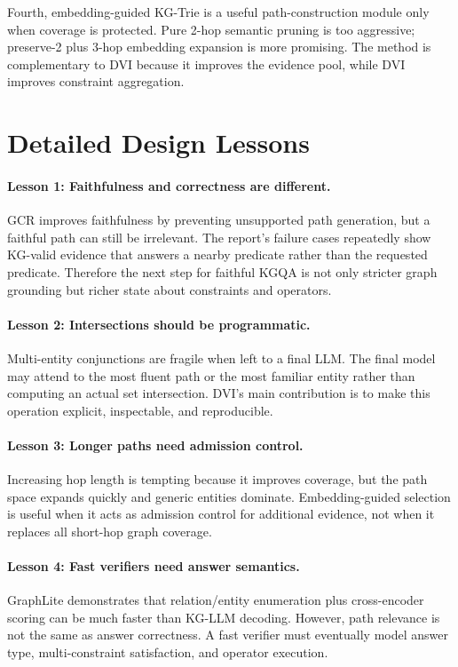 \documentclass[10pt,twocolumn]{article}
\begin{document}
Fourth, embedding-guided KG-Trie is a useful path-construction module only when coverage is protected. Pure 2-hop semantic pruning is too aggressive; preserve-2 plus 3-hop embedding expansion is more promising. The method is complementary to DVI because it improves the evidence pool, while DVI improves constraint aggregation.


\section{Detailed Design Lessons}
\paragraph{Lesson 1: Faithfulness and correctness are different.}
GCR improves faithfulness by preventing unsupported path generation, but a faithful path can still be irrelevant. The report's failure cases repeatedly show KG-valid evidence that answers a nearby predicate rather than the requested predicate. Therefore the next step for faithful KGQA is not only stricter graph grounding but richer state about constraints and operators.

\paragraph{Lesson 2: Intersections should be programmatic.}
Multi-entity conjunctions are fragile when left to a final LLM. The final model may attend to the most fluent path or the most familiar entity rather than computing an actual set intersection. DVI's main contribution is to make this operation explicit, inspectable, and reproducible.

\paragraph{Lesson 3: Longer paths need admission control.}
Increasing hop length is tempting because it improves coverage, but the path space expands quickly and generic entities dominate. Embedding-guided selection is useful when it acts as admission control for additional evidence, not when it replaces all short-hop graph coverage.

\paragraph{Lesson 4: Fast verifiers need answer semantics.}
GraphLite demonstrates that relation/entity enumeration plus cross-encoder scoring can be much faster than KG-LLM decoding. However, path relevance is not the same as answer correctness. A fast verifier must eventually model answer type, multi-constraint satisfaction, and operator execution.
\end{document}
